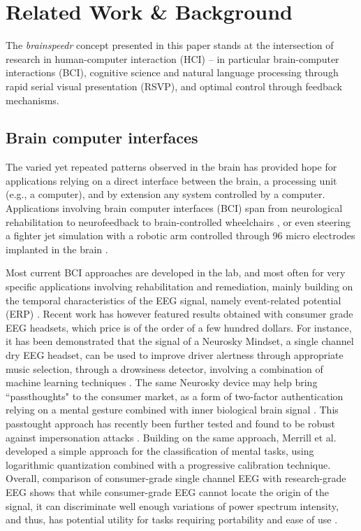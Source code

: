 \section{Related Work \& Background}
The {\it brainspeedr} concept presented in this paper stands at the intersection of research in human-computer interaction (HCI) -- in particular brain-computer interactions (BCI), cognitive science and natural language processing through rapid serial visual presentation (RSVP), and optimal control through feedback mechanisms. 

\subsection{Brain computer interfaces}

The varied yet repeated patterns observed in the brain has provided hope for applications relying on a direct interface between the brain, a processing unit (e.g., a computer), and by extension any system controlled by a computer. Applications involving brain computer interfaces (BCI) span from neurological rehabilitation \cite{daly2008brain} to neurofeedback \cite{lubar1995evaluation,fuchs2003neurofeedback} to brain-controlled wheelchairs \cite{galan2008brain}, or even steering a fighter jet simulation with a robotic arm controlled through 96 micro electrodes implanted in the brain \cite{BCIfighterJet2015}.

Most current BCI approaches are developed in the lab, and most often for very specific applications involving rehabilitation and remediation, mainly building on the temporal characteristics of the EEG signal, namely event-related potential (ERP) \cite{brouwer2010tactile}. Recent work has however featured results obtained with consumer grade EEG headsets, which price is of the order of a few hundred dollars. For instance, it has been demonstrated that the signal of a Neurosky Mindset, a single channel dry EEG headset, can be used to improve driver alertness through appropriate music selection, through a drowsiness detector, involving a combination of machine learning techniques \cite{liu2013driverAlertness}. The same Neurosky device may help bring ``passthoughts"  to the consumer market, as a form of two-factor authentication relying on a mental gesture combined with inner biological brain signal \cite{chuang2013ithink}. This passtought approach has recently been further tested and found to be robust against impersonation attacks \cite{jonhson2014mythoughts}. Building on the same approach, Merrill et al. \cite{merrill2015} developed a simple approach for the classification of mental tasks, using logarithmic quantization combined with a progressive calibration technique. Overall, comparison of consumer-grade single channel EEG with research-grade EEG shows that while consumer-grade EEG cannot locate the origin of the signal, it can discriminate well enough variations of power spectrum intensity, and thus, has potential utility for tasks requiring portability and ease of use \cite{johnstone2012eeg}.


